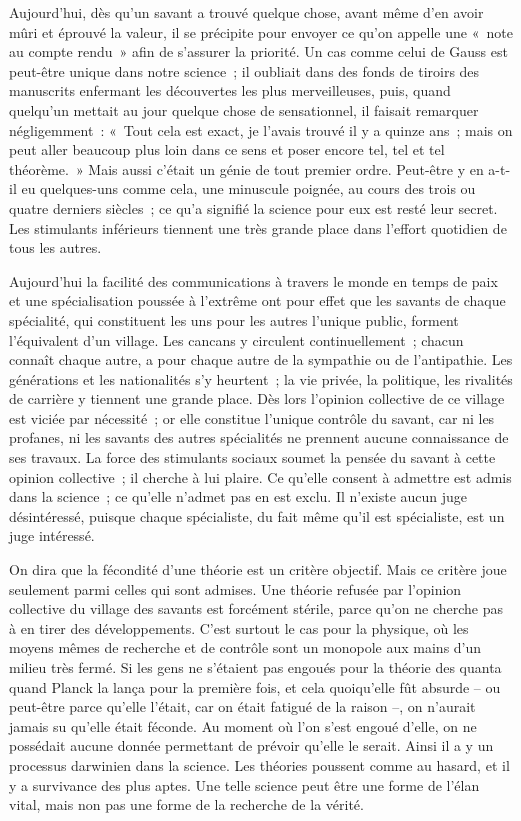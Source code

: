 \documentclass[french,twoside]{book} %
\begin{document}
Aujourd'hui, dès qu'un savant a trouvé quelque chose, avant même d'en avoir mûri et éprouvé la valeur, il se précipite pour envoyer ce qu'on appelle une « note au compte rendu » afin de s'assurer la priorité. Un cas comme celui de Gauss est peut-être unique dans notre science ; il oubliait dans des fonds de tiroirs des manuscrits enfermant les découvertes les plus merveilleuses, puis, quand quelqu'un mettait au jour quelque chose de sensationnel, il faisait remarquer négligemment : « Tout cela est exact, je l'avais trouvé il y a quinze ans ; mais on peut aller beaucoup plus loin dans ce sens et poser encore tel, tel et tel théorème. » Mais aussi c'était un génie de tout premier ordre. Peut-être y en a-t-il eu quelques-uns comme cela, une minuscule poignée, au cours des trois ou quatre derniers siècles ; ce qu'a signifié la science pour eux est resté leur secret. Les stimulants inférieurs tiennent une très grande place dans l'effort quotidien de tous les autres.\par
Aujourd'hui la facilité des communications à travers le monde en temps de paix et une spécialisation poussée à l'extrême ont pour effet que les savants de chaque spécialité, qui constituent les uns pour les autres l'unique public, forment l'équivalent d'un village. Les cancans y circulent continuellement ; chacun connaît chaque autre, a pour chaque autre de la sympathie ou de l'antipathie. Les générations et les nationalités s'y heurtent ; la vie privée, la politique, les rivalités de carrière y tiennent une grande place. Dès lors l'opinion collective de ce village est viciée par nécessité ; or elle constitue l'unique contrôle du savant, car ni les profanes, ni les savants des autres spécialités ne prennent aucune connaissance de ses travaux. La force des stimulants sociaux soumet la pensée du savant à cette opinion collective ; il cherche à lui plaire. Ce qu'elle consent à admettre est admis dans la science ; ce qu'elle n'admet pas en est exclu. Il n'existe aucun juge désintéressé, puisque chaque spécialiste, du fait même qu'il est spécialiste, est un juge intéressé.\par
\par
On dira que la fécondité d'une théorie est un critère objectif. Mais ce critère joue seulement parmi celles qui sont admises. Une théorie refusée par l'opinion collective du village des savants est forcément stérile, parce qu'on ne cherche pas à en tirer des développements. C'est surtout le cas pour la physique, où les moyens mêmes de recherche et de contrôle sont un monopole aux mains d'un milieu très fermé. Si les gens ne s'étaient pas engoués pour la théorie des quanta quand Planck la lança pour la première fois, et cela quoiqu'elle fût absurde – ou peut-être parce qu'elle l'était, car on était fatigué de la raison –, on n'aurait jamais su qu'elle était féconde. Au moment où l'on s'est engoué d'elle, on ne possédait aucune donnée permettant de prévoir qu'elle le serait. Ainsi il a y un processus darwinien dans la science. Les théories poussent comme au hasard, et il y a survivance des plus aptes. Une telle science peut être une forme de l'élan vital, mais non pas une forme de la recherche de la vérité.\par
\end{document}
